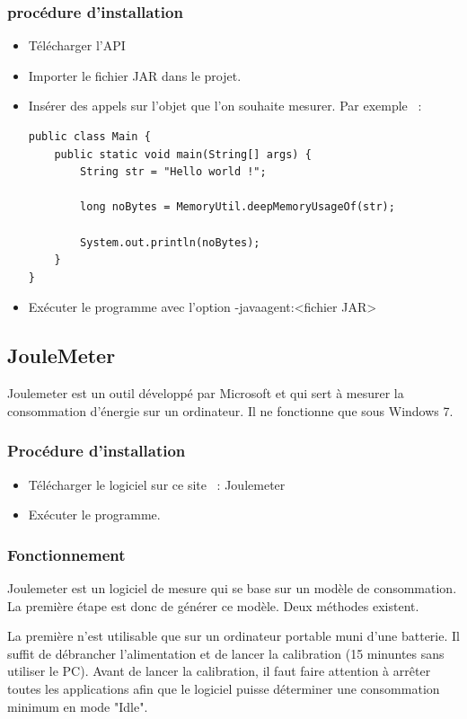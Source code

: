 \documentclass[a4paper, 11pt]{report}
\begin{document}
\subsubsection{procédure d'installation}
\begin{itemize}
	\item Télécharger l’API
	\item Importer le fichier JAR dans le projet.
	\item Insérer des appels sur l’objet que l’on souhaite mesurer. Par exemple ~:
\begin{verbatim}
public class Main {
	public static void main(String[] args) {
		String str = "Hello world !";
		
		long noBytes = MemoryUtil.deepMemoryUsageOf(str);
		
		System.out.println(noBytes);
	}
}
\end{verbatim}
	\item Exécuter le programme avec l’option -javaagent:<fichier JAR>
\end{itemize}

\subsection{JouleMeter}
Joulemeter est un outil développé par Microsoft et qui sert à mesurer la consommation d’énergie sur un ordinateur. Il ne fonctionne que sous Windows 7.

\subsubsection{Procédure d'installation}
\begin{itemize}
	\item Télécharger le logiciel sur ce site ~: Joulemeter
	\item Exécuter le programme.
\end{itemize}

\subsubsection{Fonctionnement}
Joulemeter est un logiciel de mesure qui se base sur un modèle de consommation. La première étape est donc de générer ce modèle. Deux méthodes existent.

La première n’est utilisable que sur un ordinateur portable muni d’une batterie. Il suffit de débrancher l’alimentation et de lancer la calibration (15 minuntes sans utiliser le PC). Avant de lancer la calibration, il faut faire attention à arrêter toutes les applications afin que le logiciel puisse déterminer une consommation minimum en mode "Idle".
\end{document}
